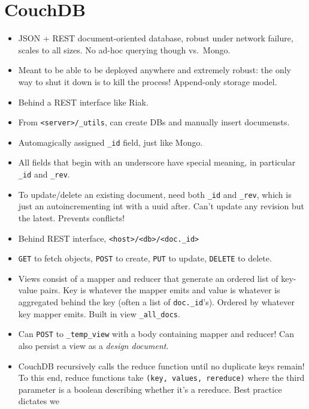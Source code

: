 \documentclass[10pt]{article}
\begin{document}
\section{CouchDB}

\begin{itemize}
    \item JSON + REST document-oriented database, robust under network failure,
        scales to all sizes. No ad-hoc querying though vs.\ Mongo.
    \item Meant to be able to be deployed anywhere and extremely robust: the
        only way to shut it down is to kill the process! Append-only storage
        model.
    \item Behind a REST interface like Riak.
    \item From \lstinline{<server>/_utils}, can create DBs and manually insert
        documensts.
    \item Automagically assigned \lstinline{_id} field, just like Mongo.
    \item All fields that begin with an underscore have special meaning, in
        particular \lstinline{_id} and \lstinline{_rev}.
    \item To update/delete an existing document, need both \lstinline{_id} and
        \lstinline{_rev}, which is just an autoincrementing int with a uuid
        after. Can't update any revision but the latest. Prevents conflicts!
    \item Behind REST interface, \lstinline{<host>/<db>/<doc._id>}
    \item \lstinline{GET} to fetch objects, \lstinline{POST} to create,
        \lstinline{PUT} to update, \lstinline{DELETE} to delete.
    \item Views consist of a mapper and reducer that generate an ordered list of
        key-value pairs. Key is whatever the mapper emits and value is whatever
        is aggregated behind the key (often a list of \lstinline{doc._id}'s).
        Ordered by whatever key mapper emits. Built in view
        \lstinline{_all_docs}.
    \item Can \lstinline{POST} to \lstinline{_temp_view} with a body containing
        mapper and reducer! Can also persist a view as a \emph{design document}.
    \item CouchDB recursively calls the reduce function until no duplicate keys
        remain! To this end, reduce functions take
        \lstinline{(key, values, rereduce)} where the third parameter is a
        boolean describing whether it's a rereduce. Best practice dictates we

\end{itemize}
\end{document}
